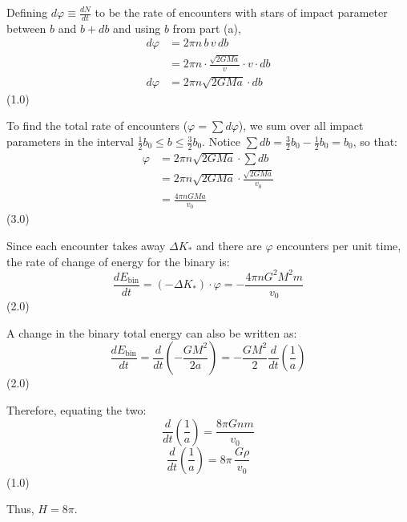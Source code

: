 \begin{description}
  Defining $d\varphi \equiv \frac{dN}{dt}$ to be the rate of encounters with
  stars of impact parameter between $b$ and $b + db$ and using $b$ from part
  (a),
  \begin{align*}
    d\varphi &= 2\pi n\, b\, v\, db \\
             &= 2\pi n \cdot \frac{\sqrt{2GMa}}{v} \cdot v \cdot db \\
    d\varphi &= 2\pi n \sqrt{2GMa} \cdot db
  \end{align*}
  \hfill(1.0)

  To find the total rate of encounters ($\varphi = \sum d\varphi$), we sum
  over all impact parameters in the interval
  $\frac{1}{2} b_0 \le b \le \frac{3}{2} b_0$. Notice
  $\sum db = \frac{3}{2} b_0 - \frac{1}{2} b_0 = b_0$, so that:
  \begin{align*}
    \varphi &= 2\pi n \sqrt{2GMa} \cdot \sum db \\
            &= 2\pi n \sqrt{2GMa} \cdot \frac{\sqrt{2GMa}}{v_0} \\
            &= \frac{4\pi n G M a}{v_0}
  \end{align*}
  \hfill(3.0)

  Since each encounter takes away $\Delta K_*$ and there are $\varphi$
  encounters per unit time, the rate of change of energy for the binary is:
  \[ \frac{dE_{\mathrm{bin}}}{dt} = (-\Delta K_*) \cdot \varphi
     = -\frac{4\pi n G^2 M^2 m}{v_0} \]
  \hfill(2.0)

  A change in the binary total energy can also be written as:
  \[ \frac{dE_{\mathrm{bin}}}{dt}
     = \frac{d}{dt}\left( -\frac{G M^2}{2a} \right)
     = -\frac{G M^2}{2} \frac{d}{dt}\left( \frac{1}{a} \right) \]
  \hfill(2.0)

  Therefore, equating the two:
  \[ \frac{d}{dt}\left( \frac{1}{a} \right) = \frac{8\pi G n m}{v_0} \]
  \[ \frac{d}{dt}\left( \frac{1}{a} \right) = 8\pi\,\frac{G\rho}{v_0} \]
  \hfill(1.0)

  Thus, $H = 8\pi$.
\end{description}


